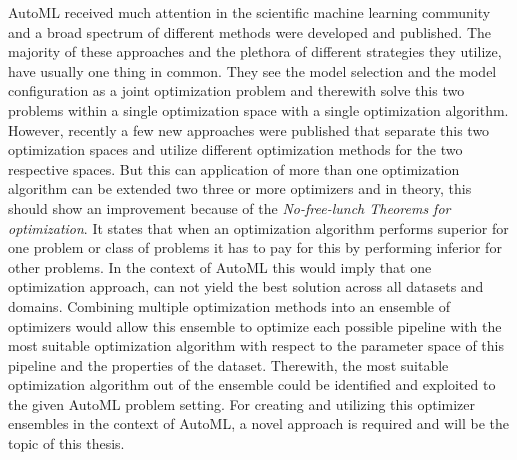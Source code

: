 AutoML received much attention in the scientific machine learning community and a broad spectrum of different methods were developed and published.
The majority of these approaches and the plethora of different strategies they utilize, have usually one thing in common.
They see the model selection and the model configuration as a joint optimization problem and therewith solve this two problems within a single optimization space with a single optimization algorithm.\newline
However, recently a few new approaches were published that separate this two optimization spaces and utilize different optimization methods for the two respective spaces.
But this can application of more than one optimization algorithm can be extended two three or more optimizers and in theory, this should show an improvement because of the \textit{No-free-lunch Theorems for optimization}.
It states that when an optimization algorithm performs superior for one problem or class of problems it has to pay for this by performing inferior for other problems.
In the context of AutoML this would imply that one optimization approach, can not yield the best solution across all datasets and domains.\newline
Combining multiple optimization methods into an ensemble of optimizers would allow this ensemble to optimize each possible pipeline with the most suitable optimization algorithm with respect to the parameter space of this pipeline and the properties of the dataset.
Therewith, the most suitable optimization algorithm out of the ensemble could be identified and exploited to the given AutoML problem setting.\newline
For creating and utilizing this optimizer ensembles in the context of AutoML, a novel approach is required and will be the topic of this thesis. 

